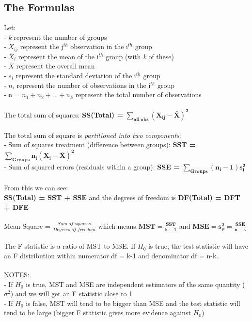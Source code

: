 \documentclass[12pt, a4paper]{article}
\begin{document}
	\subsection{The Formulas}	
	Let: \\
	- \textit{k} represent the number of groups \\
	- $X_{ij}$ represent the j$^{th}$ observation in the i$^{th}$ group \\
	- $\bar{X}_i$ represent the mean of the i$^{th}$ group (with \textit{k} of these) \\
	- $\bar{X}$ represent the overall mean \\
	- $s_i$ represent the standard deviation of the i$^{th}$ group \\
	- $n_i$ represent the number of observations in the i$^{th}$ group \\
	- n = $n_1 + n_2 + ... + n_k$ represent the total number of observations \\~\\
	The total sum of squares: \textbf{SS(Total) = }$\bm{\sum_{all\;obs}(X_{ij}-\bar{X})^2}$ \\~\\
	The total sum of square is \textit{partitioned into two components}: \\
	- Sum of squares treatment (difference between groups): \textbf{SST = }$\bm{\sum_{Groups}n_i(X_{i}-\bar{X})^2}$ \\
	- Sum of squared errors (residuals within a group): \textbf{SSE = }$\bm{\sum_{Groups}(n_i-1)s_i^2}$ \\~\\
	From this we can see: \\
	\textbf{SS(Total) = SST + SSE} and the degrees of freedom is \textbf{DF(Total) = DFT + DFE} \\~\\
	Mean Square = $\frac{Sum\;of\;squares}{Degrees\;of\;freedom}$ which means $\bm{MST = \frac{SST}{k-1}}$ and $\bm{MSE = s_p^2 = \frac{SSE}{n-k}}$ \\~\\
	The F statistic is a ratio of MST to MSE. If $H_0$ is true, the test statistic will have an F distribution within numerator df = k-1 and denominator df = n-k. \\~\\
	NOTES: \\
	- If $H_0$ is true, MST and MSE are independent estimators of the same quantity ($\sigma^2$) and we \hspace*{2mm} will get an F statistic close to 1\\
	- If $H_0$ is false, MST will tend to be bigger than MSE and the test statistic will tend to be \hspace*{2mm} large (bigger F statistic gives more evidence against $H_0$) \newpage
	
\end{document}
